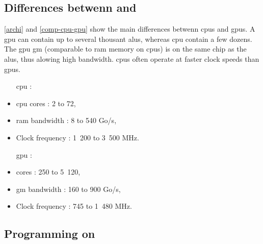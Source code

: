 \appendix

\label{principegpu}
\subsection{Differences betwenn  and }

\autoref{archi} and \autoref{comp-cpu-gpu} show the main differences betwenn \glspl{cpu} and \glspl{gpu}. 
A \gls{gpu} can contain up to several thousant \glspl{alu}, whereas \gls{cpu} contain a few dozens.
The \gls{gpu} \gls{gm} (comparable to \gls{ram} memory on \glspl{cpu}) is on the same chip as the \glspl{alu}, thus alowing high bandwidth.
\glspl{cpu} often operate at faster clock speeds than \glspl{gpu}.

\begin{table}[H]
\begin{multicols}{2}
\begin{itemize}
\item [\gls{cpu} :]
\item \gls{cpu} cores : 2 to 72,
\item \gls{ram} bandwidth : 8 to 540 Go/s,
\item Clock frequency : 1~200 to 3~500 MHz.
\end{itemize}
\columnbreak
\begin{itemize}
\item [\gls{gpu} :]
\item {} cores : 250 to 5~120,
\item \Gls{gm} bandwidth : 160 to 900 Go/s,
\item Clock frequency : 745 to 1~480 MHz.
\end{itemize}
\end{multicols}
\caption{Comparison of typical specifications of \glspl{cpu} and \glspl{gpu}}
\label{comp-cpu-gpu}
\end{table}



\subsection{Programming on }
\label{partgpu}

